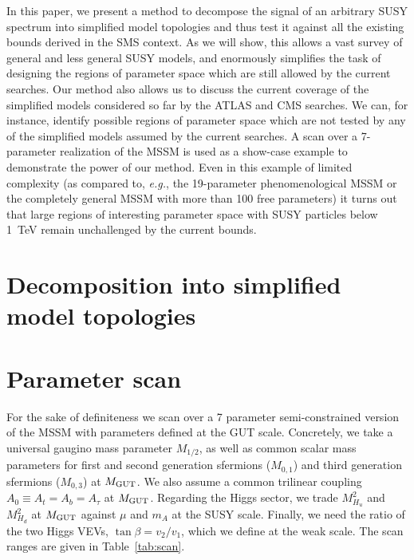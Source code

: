 \documentclass[12pt]{article}
\def\eg{{\it e.g.}}
\def\mgut{M_{\rm GUT}}
\begin{document}
In this paper, we present a method to decompose the signal of an arbitrary SUSY spectrum into simplified model  
topologies and thus test it against all the existing bounds derived in the SMS context. 
As we will show, this allows a vast survey of general and less general SUSY models, and enormously simplifies the task of designing the regions of parameter space which are still allowed by the current searches.
Our method also allows us to discuss the current coverage of the simplified models considered so far
by the ATLAS and CMS searches. We can, for instance, identify possible regions 
of parameter space which are not tested by any of the simplified models assumed by the current searches.
A scan over a 7-parameter realization of the MSSM is used as a show-case example to demonstrate the power of our method. 
Even in this example of limited complexity (as compared to, \eg, the 19-parameter phenomenological MSSM or the completely general MSSM with more than 100 free parameters) it turns out that large regions of interesting parameter space with SUSY particles below 1~TeV %
remain unchallenged by the current bounds. 




\section{Decomposition into simplified model topologies}


\section{Parameter scan}

For the sake of definiteness we scan over a 7 parameter semi-constrained version of the MSSM 
with parameters defined at the GUT scale. 
Concretely, we take a universal gaugino mass parameter $M_{1/2}$,  as well as common scalar mass parameters 
for first and second generation sfermions ($M_{0,1}$) and third generation sfermions ($M_{0,3}$) at $\mgut$.  
We also assume a common trilinear coupling $A_0\equiv A_t=A_b=A_\tau$ at $\mgut$. 
Regarding the Higgs sector,  we trade $M_{H_u}^2$ and $M_{H_d}^2$ at $\mgut$ against 
$\mu$ and $m_A$ at the SUSY scale. Finally, we need the ratio of the two Higgs VEVs, $\tan\beta=v_2/v_1$, 
which we define at the weak scale. 
The scan ranges are given in Table~\ref{tab:scan}.
\end{document}
